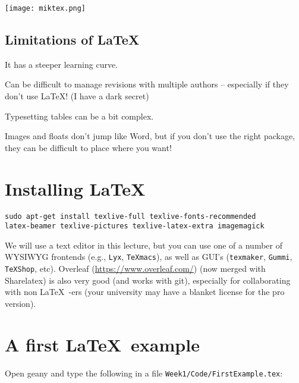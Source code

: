 \begin{center}	
	\texttt{[image: miktex.png]}
\end{center}

\subsection{Limitations of \LaTeX}

\begin{compactitem}\itemsep10pt
  \item It has a steeper learning curve.
  
  \item Can be difficult to manage revisions with multiple authors -- 
especially if they don't use \LaTeX! (I have a dark secret)
    
  \item Typesetting tables can be a bit complex.

    \item Images and floats don't jump like Word, but if you don't use the 
right package, they can be difficult to place where you want! 

  \end{compactitem}

\section{Installing \LaTeX}
 
\begin{lstlisting} 
sudo apt-get install texlive-full texlive-fonts-recommended 
latex-beamer texlive-pictures texlive-latex-extra imagemagick       
\end{lstlisting}

We will use a text editor in this lecture, but you can use one of a 
number of WYSIWYG frontends (e.g., {\tt Lyx}, {\tt TeXmacs}), as well 
as GUI's ({\tt texmaker}, {\tt Gummi}, {\tt TeXShop}, etc). Overleaf (\url{https://www.overleaf.com/})
(now merged with Sharelatex) is also very good (and works with git), especially for 
collaborating with non \LaTeX~-ers (your university may have a blanket 
license for the pro version).  

\section{A first \LaTeX~example}

\begin{compactitem}[$\quad\star$]\itemsep4pt{}
  \item Open geany and type the following in a file
	{\tt Week1/Code/FirstExample.tex}:
\end{compactitem}

